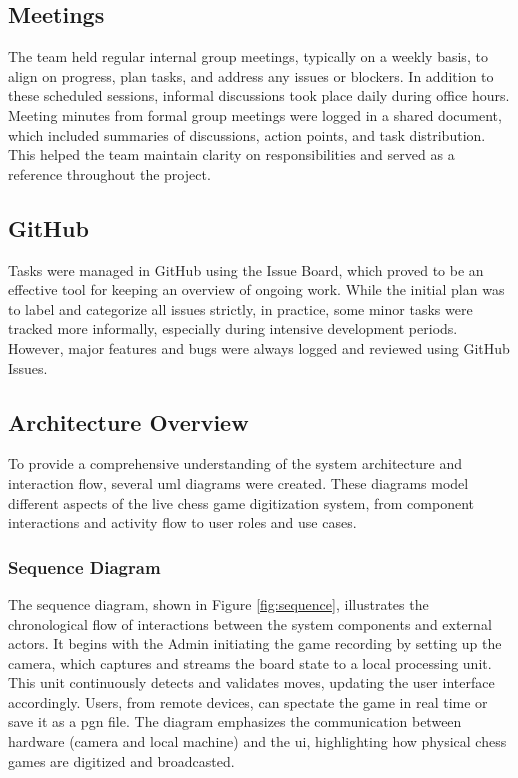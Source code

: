 \subsection{Meetings}
The team held regular internal group meetings, typically on a weekly basis, to align on progress, plan tasks, and address any issues or blockers. In addition to these scheduled sessions, informal discussions took place daily during office hours. Meeting minutes from formal group meetings were logged in a shared document, which included summaries of discussions, action points, and task distribution. This helped the team maintain clarity on responsibilities and served as a reference throughout the project.


\subsection{GitHub}
Tasks were managed in GitHub using the Issue Board, which proved to be an effective tool for keeping an overview of ongoing work. While the initial plan was to label and categorize all issues strictly, in practice, some minor tasks were tracked more informally, especially during intensive development periods. However, major features and bugs were always logged and reviewed using GitHub Issues.

\subsection{Architecture Overview}
\label{subsec:diagrams}

To provide a comprehensive understanding of the system architecture and interaction flow, several \gls{uml} diagrams were created. These diagrams model different aspects of the live chess game digitization system, from component interactions and activity flow to user roles and use cases.

\subsubsection*{Sequence Diagram}
\label{subsubsec:sequence-diagram}

The sequence diagram, shown in Figure \ref{fig:sequence}, illustrates the chronological flow of interactions between the system components and external actors. It begins with the Admin initiating the game recording by setting up the camera, which captures and streams the board state to a local processing unit. This unit continuously detects and validates moves, updating the user interface accordingly. Users, from remote devices, can spectate the game in real time or save it as a \gls{pgn} file. The diagram emphasizes the communication between hardware (camera and local machine) and the \gls{ui}, highlighting how physical chess games are digitized and broadcasted.

